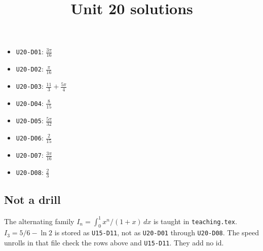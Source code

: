 \title{Unit 20 solutions}\maketitle\begin{itemize}
  \item \texttt{U20-D01}: $\frac{3 \pi}{16}$
  \item \texttt{U20-D02}: $\frac{\pi}{16}$
  \item \texttt{U20-D03}: $\frac{11}{3} + \frac{5 \pi}{4}$
  \item \texttt{U20-D04}: $\frac{8}{15}$
  \item \texttt{U20-D05}: $\frac{5 \pi}{32}$
  \item \texttt{U20-D06}: $\frac{2}{15}$
  \item \texttt{U20-D07}: $\frac{3 \pi}{16}$
  \item \texttt{U20-D08}: $\frac{2}{3}$
\end{itemize}
\subsection*{Not a drill}
The alternating family $I_n=\int_0^1 x^n/(1+x)\,dx$ is taught in \texttt{teaching.tex}. $I_3=5/6-\ln 2$ is stored as \texttt{U15-D11}, not as \texttt{U20-D01} through \texttt{U20-D08}. The speed unrolls in that file check the rows above and \texttt{U15-D11}. They add no id.


